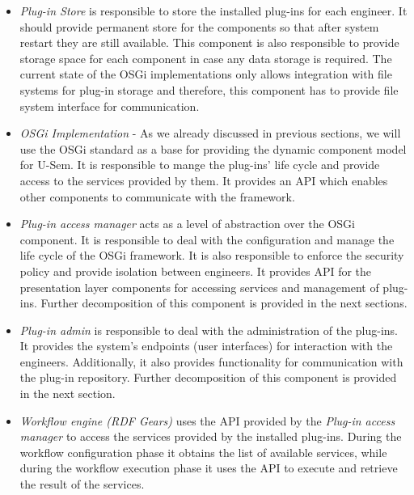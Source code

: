 \begin{itemize}

\item \textit{Plug-in Store} is responsible to store the installed plug-ins for each engineer. It should provide permanent store for the components so that after system restart they are still available. This component is also responsible to provide storage space for each component in case any data storage is required. The current state of the OSGi implementations only allows integration with file systems for plug-in storage and therefore, this component has to provide file system interface for communication.

\item \textit{OSGi Implementation} - As we already discussed in previous sections, we will use the OSGi standard as a base for providing the dynamic component model for U-Sem. It is responsible to mange the plug-ins' life cycle and provide access to the services provided by them. It provides an API which enables other components to communicate with the framework.

\item \textit{Plug-in access manager} acts as a level of abstraction over the OSGi component. It is responsible to deal with the configuration and manage the life cycle of the OSGi framework. It is also responsible to enforce the security policy and provide isolation between engineers. It provides API for the presentation layer components for accessing services and management of plug-ins. Further decomposition of this component is provided in the next sections.

\item \textit{Plug-in admin} is responsible to deal with the administration of the plug-ins. It provides the system's endpoints (user interfaces) for interaction with the engineers. Additionally, it also provides functionality for communication with the plug-in repository. Further decomposition of this component is provided in the next section. 

\item \textit{Workflow engine (RDF Gears)} uses the API provided by the \textit{Plug-in access manager} to access the services provided by the installed plug-ins. During the workflow configuration phase it obtains the list of available services, while during the workflow execution phase it uses the API to execute and retrieve the result of the services.
	
\end{itemize}



